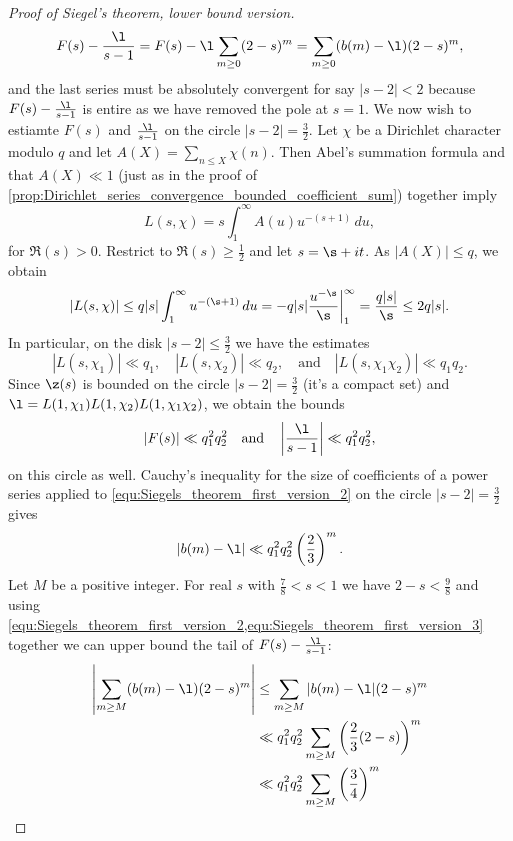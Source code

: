 \begin{proof}[Proof of Siegel's theorem, lower bound version]
\begin{equation}
          F(s)-\frac{\l}{s-1} = F(s)-\l\sum_{m \ge 0}(2-s)^{m} = \sum_{m \ge 0}(b(m)-\l)(2-s)^{m},
        \end{equation}
        and the last series must be absolutely convergent for say $|s-2| < 2$ because $F(s)-\frac{\l}{s-1}$ is entire as we have removed the pole at $s = 1$. We now wish to estiamte $F(s)$ and $\frac{\l}{s-1}$ on the circle $|s-2| = \frac{3}{2}$. Let $\chi$ be a Dirichlet character modulo $q$ and let $A(X) = \sum_{n \le X}\chi(n)$. Then Abel's summation formula and that $A(X) \ll 1$ (just as in the proof of \cref{prop:Dirichlet_series_convergence_bounded_coefficient_sum}) together imply
        \[
          L(s,\chi) = s\int_{1}^{\infty}A(u)u^{-(s+1)}\,du,
        \]
        for $\Re(s) > 0$. Restrict to $\Re(s) \ge \frac{1}{2}$ and let $s = \s+it$. As $|A(X)| \le q$, we obtain
        \[
          |L(s,\chi)| \le q|s|\int_{1}^{\infty}u^{-(\s+1)}\,du = -q|s|\frac{u^{-\s}}{\s}\bigg|_{1}^{\infty} = \frac{q|s|}{\s} \le 2q|s|.
        \]
        In particular, on the disk $|s-2| \le \frac{3}{2}$ we have the estimates
        \[
          |L(s,\chi_{1})| \ll q_{1}, \quad |L(s,\chi_{2})| \ll q_{2}, \quad \text{and} \quad |L(s,\chi_{1}\chi_{2})| \ll q_{1}q_{2}.
        \]
        Since $\z(s)$ is bounded on the circle $|s-2| = \frac{3}{2}$ (it's a compact set) and $\l = L(1,\chi_{1})L(1,\chi_{2})L(1,\chi_{1}\chi_{2})$, we obtain the bounds
        \[
          |F(s)| \ll q_{1}^{2}q_{2}^{2} \quad \text{and} \quad \left|\frac{\l}{s-1}\right| \ll q_{1}^{2}q_{2}^{2},
        \]
        on this circle as well. Cauchy's inequality for the size of coefficients of a power series applied to \cref{equ:Siegels_theorem_first_version_2} on the circle $|s-2| = \frac{3}{2}$ gives
        \begin{equation}\label{equ:Siegels_theorem_first_version_3}
          |b(m)-\l| \ll q_{1}^{2}q_{2}^{2}\left(\frac{2}{3}\right)^{m}.
        \end{equation}
        Let $M$ be a positive integer. For real $s$ with $\frac{7}{8} < s < 1$ we have $2-s < \frac{9}{8}$ and using \cref{equ:Siegels_theorem_first_version_2,equ:Siegels_theorem_first_version_3} together we can upper bound the tail of $F(s)-\frac{\l}{s-1}$:
        \begin{align*}
          \left|\sum_{m \ge M}(b(m)-\l)(2-s)^{m}\right| &\le \sum_{m \ge M}|b(m)-\l|(2-s)^{m} \\
          &\ll q_{1}^{2}q_{2}^{2}\sum_{m \ge M}\left(\frac{2}{3}(2-s)\right)^{m} \\
          &\ll q_{1}^{2}q_{2}^{2}\sum_{m \ge M}\left(\frac{3}{4}\right)^{m} \\

\end{align*}
\end{proof}
